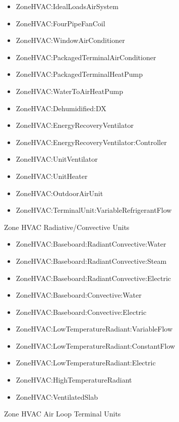 \begin{itemize}
\tightlist
\item
  ZoneHVAC:IdealLoadsAirSystem
\item
  ZoneHVAC:FourPipeFanCoil
\item
  ZoneHVAC:WindowAirConditioner
\item
  ZoneHVAC:PackagedTerminalAirConditioner
\item
  ZoneHVAC:PackagedTerminalHeatPump
\item
  ZoneHVAC:WaterToAirHeatPump
\item
  ZoneHVAC:Dehumidified:DX
\item
  ZoneHVAC:EnergyRecoveryVentilator
\item
  ZoneHVAC:EnergyRecoveryVentilator:Controller
\item
  ZoneHVAC:UnitVentilator
\item
  ZoneHVAC:UnitHeater
\item
  ZoneHVAC:OutdoorAirUnit
\item
  ZoneHVAC:TerminalUnit:VariableRefrigerantFlow
\end{itemize}

Zone HVAC Radiative/Convective Units

\begin{itemize}
\tightlist
\item
  ZoneHVAC:Baseboard:RadiantConvective:Water
\item
  ZoneHVAC:Baseboard:RadiantConvective:Steam
\item
  ZoneHVAC:Baseboard:RadiantConvective:Electric
\item
  ZoneHVAC:Baseboard:Convective:Water
\item
  ZoneHVAC:Baseboard:Convective:Electric
\item
  ZoneHVAC:LowTemperatureRadiant:VariableFlow
\item
  ZoneHVAC:LowTemperatureRadiant:ConstantFlow
\item
  ZoneHVAC:LowTemperatureRadiant:Electric
\item
  ZoneHVAC:HighTemperatureRadiant
\item
  ZoneHVAC:VentilatedSlab
\end{itemize}

Zone HVAC Air Loop Terminal Units

